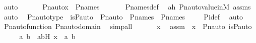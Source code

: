 \begin{isabellebody}
\ auto\ \isanewline
\ \ \isamarkupfalse%
\ \isamarkupfalse%
\ {\isachardoublequoteopen}Pn{\isacharunderscore}{\kern0pt}auto{\isacharparenleft}{\kern0pt}{\isasympi}{\isacharparenright}{\kern0pt}{\isacharbackquote}{\kern0pt}x\ {\isasymin}\ P{\isacharunderscore}{\kern0pt}names{\isachardoublequoteclose}\ \isanewline
\ \ \ \ \isamarkupfalse%
\ P{\isacharunderscore}{\kern0pt}names{\isacharunderscore}{\kern0pt}def\ \isamarkupfalse%
\ ah\ Pn{\isacharunderscore}{\kern0pt}auto{\isacharunderscore}{\kern0pt}value{\isacharunderscore}{\kern0pt}in{\isacharunderscore}{\kern0pt}M\ assms\ \isamarkupfalse%
\ auto\ \isanewline
{}\isamarkupfalse%
%
\endisatagproof
{\isafoldproof}%
%
\isadelimproof
\isanewline
%
\endisadelimproof
\isanewline
{}\isamarkupfalse%
\ Pn{\isacharunderscore}{\kern0pt}auto{\isacharunderscore}{\kern0pt}type\ {\isacharcolon}{\kern0pt}\ {\isachardoublequoteopen}is{\isacharunderscore}{\kern0pt}P{\isacharunderscore}{\kern0pt}auto{\isacharparenleft}{\kern0pt}{\isasympi}{\isacharparenright}{\kern0pt}\ {\isasymLongrightarrow}\ Pn{\isacharunderscore}{\kern0pt}auto{\isacharparenleft}{\kern0pt}{\isasympi}{\isacharparenright}{\kern0pt}\ {\isasymin}\ P{\isacharunderscore}{\kern0pt}names\ {\isasymrightarrow}\ P{\isacharunderscore}{\kern0pt}names{\isachardoublequoteclose}\ \isanewline
%
\isadelimproof
\ \ %
\endisadelimproof
%
\isatagproof
{}\isamarkupfalse%
\ Pi{\isacharunderscore}{\kern0pt}def\ \isamarkupfalse%
\ auto\ \isamarkupfalse%
\ Pn{\isacharunderscore}{\kern0pt}auto{\isacharunderscore}{\kern0pt}function\ Pn{\isacharunderscore}{\kern0pt}auto{\isacharunderscore}{\kern0pt}domain\ \isamarkupfalse%
\ simp{\isacharunderscore}{\kern0pt}all\isanewline
{}\isamarkupfalse%
\ {\isacharminus}{\kern0pt}\ \isanewline
\ \ \isamarkupfalse%
\ x\ \isamarkupfalse%
\ assm\ {\isacharcolon}{\kern0pt}\ {\isachardoublequoteopen}x\ {\isasymin}\ Pn{\isacharunderscore}{\kern0pt}auto{\isacharparenleft}{\kern0pt}{\isasympi}{\isacharparenright}{\kern0pt}{\isachardoublequoteclose}\ {\isachardoublequoteopen}is{\isacharunderscore}{\kern0pt}P{\isacharunderscore}{\kern0pt}auto{\isacharparenleft}{\kern0pt}{\isasympi}{\isacharparenright}{\kern0pt}{\isachardoublequoteclose}\isanewline
\ \ \isamarkupfalse%
\ \isamarkupfalse%
\ a\ b\ \ abH{\isacharcolon}{\kern0pt}\ {\isachardoublequoteopen}x\ {\isacharequal}{\kern0pt}\ {\isacharless}{\kern0pt}a{\isacharcomma}{\kern0pt}\ b{\isachargreater}{\kern0pt}{\isachardoublequoteclose}\ \isamarkupfalse%

\end{isabellebody}
